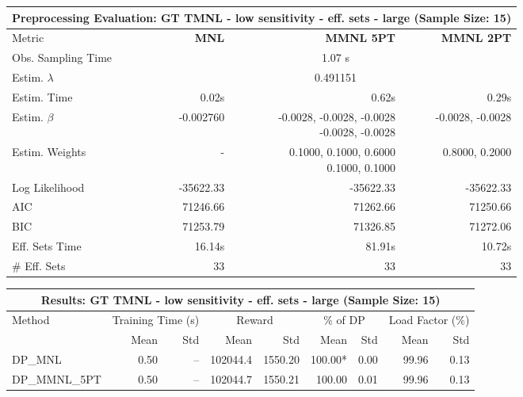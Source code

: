 
\begin{samepage}
\begin{center}
  \small
  \begin{tabular}{l|r|r|r}
    \toprule
    \multicolumn{4}{c}{\textbf{Preprocessing Evaluation: GT TMNL - low sensitivity - eff. sets - large (Sample Size: 15)}} \\
    \midrule
    Metric & \textbf{MNL} & \textbf{MMNL 5PT} & \textbf{MMNL 2PT} \\
    \midrule
    Obs. Sampling Time & \multicolumn{3}{c}{1.07 s} \\
    Estim. $\lambda$ & \multicolumn{3}{c}{0.491151} \\
    Estim. Time & 0.02s & 0.62s & 0.29s \\
    Estim. $\beta$ & -0.002760 & \makecell[tr]{-0.0028, -0.0028, -0.0028 \\ -0.0028, -0.0028} & -0.0028, -0.0028 \\
    Estim. Weights & - & \makecell[tr]{0.1000, 0.1000, 0.6000 \\ 0.1000, 0.1000} & 0.8000, 0.2000 \\
    Log Likelihood & -35622.33 & -35622.33 & -35622.33 \\
    AIC & 71246.66 & 71262.66 & 71250.66 \\
    BIC & 71253.79 & 71326.85 & 71272.06 \\
    Eff. Sets Time & 16.14s & 81.91s & 10.72s \\
    \# Eff. Sets & 33 & 33 & 33 \\
    \bottomrule
  \end{tabular}
\end{center}
\begin{center}
  \small
  \begin{tabular}{l|rr|rr|rr|rr}
    \toprule
    \multicolumn{9}{c}{\textbf{Results: GT TMNL - low sensitivity - eff. sets - large (Sample Size: 15)}} \\
    \midrule
    Method & \multicolumn{2}{c|}{Training Time (s)} & \multicolumn{2}{c|}{Reward} & \multicolumn{2}{c|}{\% of DP} & \multicolumn{2}{c}{Load Factor (\%)} \\
    & Mean & Std & Mean & Std & Mean & Std & Mean & Std \\
    \midrule
    DP\_MNL      &     0.50 &    -- &   102044.4 &    1550.20 & 100.00* &    0.00 &   99.96 &    0.13 \\
    DP\_MMNL\_5PT &     0.50 &    -- &   102044.7 &    1550.21 &  100.00 &    0.01 &   99.96 &    0.13 \\

\end{tabular}
\end{center}
\end{samepage}
